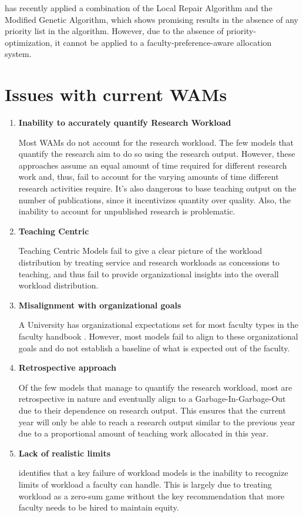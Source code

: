 \parencite{dofadar2021hybrid} has recently applied a combination of the Local Repair Algorithm and the Modified Genetic Algorithm, which shows promising results in the absence of any priority list in the algorithm. However, due to the absence of priority-optimization, it cannot be applied to a faculty-preference-aware allocation system.

\section{Issues with current WAMs}

\begin{enumerate}

\item \textbf{Inability to accurately quantify Research Workload}

Most WAMs do not account for the research workload. The few models that quantify the research aim to do so using the research output. However, these approaches assume an equal amount of time required for different research work and, thus, fail to account for the varying amounts of time different research activities require. It's also dangerous to base teaching output on the number of publications, since it incentivizes quantity over quality. Also, the inability to account for unpublished research is problematic.

\item \textbf{Teaching Centric}

Teaching Centric Models fail to give a clear picture of the workload distribution by treating service and research workloads as concessions to teaching, and thus fail to provide organizational insights into the overall workload distribution. \parencite{rohan2017} 

\item \textbf{Misalignment with organizational goals}

A University has organizational expectations set for most faculty types in the faculty handbook \parencite{griffith2020framework}. However, most models fail to align to these organizational goals and do not establish a baseline of what is expected out of the faculty. 

\item \textbf{Retrospective approach}

Of the few models that manage to quantify the research workload, most are retrospective in nature and eventually align to a Garbage-In-Garbage-Out due to their dependence on research output. This ensures that the current year will only be able to reach a research output similar to the previous year due to a proportional amount of teaching work allocated in this year.

\item \textbf{Lack of realistic limits}

\parencite{vardi2009impacts} identifies that a key failure of workload models is the inability to recognize limits of workload a faculty can handle. This is largely due to treating workload as a zero-sum game without the key recommendation that more faculty needs to be hired to maintain equity.
\end{enumerate}


